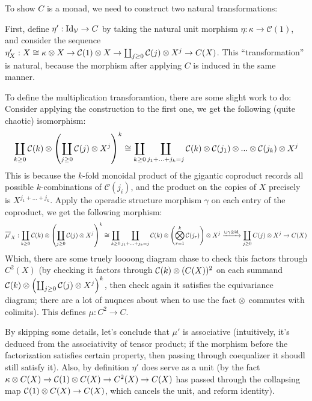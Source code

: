 \documentclass{article}
\begin{document}
\hfil

To show $C$ is a monad, we need to construct two natural transformations:

First, define $\eta':\mathrm{Id}_\mathcal{V}\rightarrow C$ by taking the natural unit morphism $\eta:\kappa\rightarrow\mathcal{C}(1)$, and consider the sequence $\eta'_X:X\cong \kappa\otimes X\rightarrow\mathcal{C}(1)\otimes X\rightarrow\coprod_{j\geq 0}\mathcal{C}(j)\otimes X^j\rightarrow C(X)$. This ``transformation'' is natural, because the morphism after applying $C$ is induced in the same manner.

To define the multiplication transforamtion, there are some slight work to do: Consider applying the construction to the first one, we get the following (quite chaotic) isomorphism:
\[\coprod_{k\geq 0}\mathcal{C}(k)\otimes \left(\coprod_{j\geq 0}\mathcal{C}(j)\otimes X^j\right)^k\cong \coprod_{k\geq 0}\coprod_{j_1+...+j_k=j}\mathcal{C}(k)\otimes\mathcal{C}(j_1)\otimes...\otimes\mathcal{C}(j_k)\otimes X^j\]
This is because the $k$-fold monoidal product of the gigantic coproduct records all possible $k$-combinations of $\mathcal{C}(j_i)$, and the product on the copies of $X$ precisely is $X^{j_1+...+j_k}$. Apply the operadic structure morphism $\gamma$ on each entry of the coproduct, we get the following morphism:
\[\overline{\mu'}_X:\coprod_{k\geq 0}\mathcal{C}(k)\otimes \left(\coprod_{j\geq 0}\mathcal{C}(j)\otimes X^j\right)^k\cong  \coprod_{k\geq 0}\coprod_{j_1+...+j_k=j}\mathcal{C}(k)\otimes \left(\bigotimes_{r=1}^k \mathcal{C}(j_r)\right)\otimes X^j \xrightarrow{\sqcup \gamma \otimes \mathrm{id}} \coprod_{j\geq 0}C(j)\otimes X^j \rightarrow C(X) \]
Which, there are some truely loooong diagram chase to check this factors through $C^2(X)$ (by checking it factors through $\mathcal{C}(k)\otimes (C(X))^2$ on each summand $\mathcal{C}(k)\otimes \left(\coprod_{j\geq 0}\mathcal{C}(j)\otimes X^j\right)^k$, then check again it satisfies the equivariance diagram; there are a lot of nuqnces about when to use the fact $\otimes$ commutes with colimits). This defines $\mu:C^2\rightarrow C$.

\hfil

By skipping some details, let's conclude that $\mu'$ is associative (intuitively, it's deduced from the associativity of tensor product; if the morphism before the factorization satisfies certain property, then passing through coequalizer it shoudl still satisfy it). Also, by definition $\eta'$ does serve as a unit (by the fact $\kappa\otimes C(X)\rightarrow \mathcal{C}(1)\otimes C(X)\rightarrow C^2(X)\rightarrow C(X)$ has passed through the collapsing map $\mathcal{C}(1)\otimes C(X)\rightarrow C(X)$, which cancels the unit, and reform identity).
\end{document}
